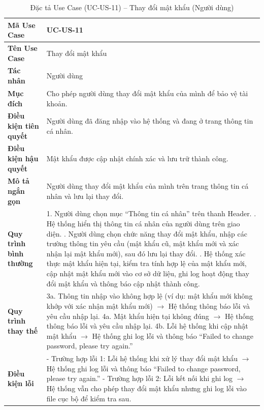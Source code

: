 \renewcommand{\arraystretch}{1.3}
\setlength{\tabcolsep}{4pt}
\begin{longtable}{|p{}|p{}|}
\caption{Đặc tả Use Case (UC-US-11) -- Thay đổi mật khẩu (Người dùng) }\label{tab:uc_change_password_user}\\
\hline
\textbf{Mã Use Case} & UC-US-11 \\ \hline
\textbf{Tên Use Case} & Thay đổi mật khẩu \\ \hline 
\textbf{Tác nhân} & Người dùng \\ \hline
\textbf{Mục đích} & Cho phép người dùng thay đổi mật khẩu của mình để bảo vệ tài khoản. \\ \hline
\textbf{Điều kiện tiên quyết} & Người dùng đã đăng nhập vào hệ thống và đang ở trang thông tin cá nhân. \\ \hline
\textbf{Điều kiện hậu quyết} & Mật khẩu được cập nhật chính xác và lưu trữ thành công. \\ \hline
\textbf{Mô tả ngắn gọn} & Người dùng thay đổi mật khẩu của mình trên trang thông tin cá nhân và lưu lại thay đổi. \\ \hline
\textbf{Quy trình bình thường} &    
1. Người dùng chọn mục “Thông tin cá nhân” trên thanh Header. \newline
2. Hệ thống hiển thị thông tin cá nhân của người dùng trên giao diện. \newline
3. Người dùng chọn chức năng thay đổi mật khẩu, nhập các trường thông tin yêu cầu (mật khẩu cũ, mật khẩu mới và xác nhận lại mật khẩu mới), sau đó lưu lại thay đổi. \newline
4. Hệ thống xác thực mật khẩu hiện tại, kiểm tra tính hợp lệ của mật khẩu mới, cập nhật mật khẩu mới vào cơ sở dữ liệu, ghi log hoạt động thay đổi mật khẩu và thông báo cập nhật thành công. \\ \hline
\textbf{Quy trình thay thế} &
3a. Thông tin nhập vào không hợp lệ (ví dụ: mật khẩu mới không khớp với xác nhận mật khẩu mới) $\rightarrow$ Hệ thống thông báo lỗi và yêu cầu nhập lại. \newline
4a. Mật khẩu hiện tại không đúng $\rightarrow$ Hệ thống thông báo lỗi và yêu cầu nhập lại. \newline
4b. Lỗi hệ thống khi cập nhật mật khẩu $\rightarrow$ Hệ thống ghi log lỗi và thông báo “Failed to change password, please try again.” \\ \hline
\textbf{Điều kiện lỗi} &
- Trường hợp lỗi 1: Lỗi hệ thống khi xử lý thay đổi mật khẩu $\rightarrow$ Hệ thống ghi log lỗi và thông báo “Failed to change password, please try again.” \newline
- Trường hợp lỗi 2: Lỗi kết nối khi ghi log $\rightarrow$ Hệ thống vẫn cho phép thay đổi mật khẩu nhưng ghi log lỗi vào file cục bộ để kiểm tra sau. \\ \hline
\end{longtable}



